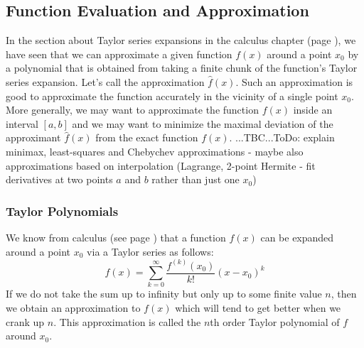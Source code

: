 

\subsection{Function Evaluation and Approximation}
In the section about Taylor series expansions in the calculus chapter (page \pageref{Sec:TaylorSeries}), we have seen that we can approximate a given function $f(x)$ around a point $x_0$ by a polynomial that is obtained from taking a finite chunk of the function's Taylor series expansion. Let's call the approximation $\hat{f}(x)$. Such an approximation is good to approximate the function accurately in the vicinity of a single point $x_0$. More generally, we may want to approximate the function $f(x)$ inside an interval $[a,b]$ and we may want to minimize the maximal deviation of the approximant  $\hat{f}(x)$ from the exact function $f(x)$. ...TBC...ToDo: explain minimax, least-squares and Chebychev approximations - maybe also approximations based on interpolation (Lagrange, 2-point Hermite - fit derivatives at two points $a$ and $b$ rather than just one $x_0$)



\subsubsection{Taylor Polynomials}
We know from calculus (see page \pageref{Eq:TaylorSeries}) that a function $f(x)$ can be expanded around a point $x_0$ via a Taylor series as follows:
\begin{equation}
f(x) = \sum_{k=0}^\infty \frac{f^{(k)}(x_0)}{k!} (x-x_0)^k
\end{equation}
If we do not take the sum up to infinity but only up to some finite value $n$, then we obtain an approximation to $f(x)$ which will tend to get better when we crank up $n$. This approximation is called the $n$th order Taylor polynomial of $f$ around $x_0$. 



